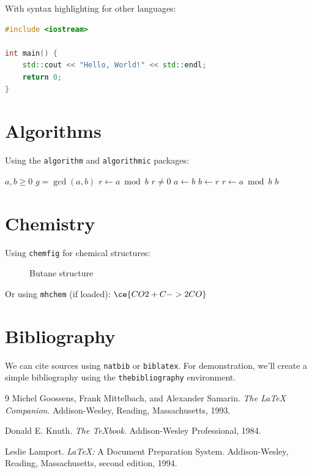 \documentclass{article}
\begin{document}
With syntax highlighting for other languages:

\begin{lstlisting}[language=C++, caption={Hello World in C++}, label={lst:hello}]
#include <iostream>

int main() {
    std::cout << "Hello, World!" << std::endl;
    return 0;
}
\end{lstlisting}

\section{Algorithms}
Using the \texttt{algorithm} and \texttt{algorithmic} packages:

\begin{algorithm}
\caption{Euclidean algorithm for GCD}
\label{alg:euclid}
\begin{algorithmic}
\REQUIRE $a,b \geq 0$
\ENSURE $g = \gcd(a,b)$
\STATE $r \gets a \bmod b$
\WHILE $r \neq 0$
\STATE $a \gets b$
\STATE $b \gets r$
\STATE $r \gets a \bmod b$
\ENDWHILE
\RETURN $b$
\end{algorithmic}
\end{algorithm}

\section{Chemistry}
Using \texttt{chemfig} for chemical structures:

\begin{figure}[H]
    \centering
    \caption{Butane structure}
    \label{fig:butane}
\end{figure}

Or using \texttt{mhchem} (if loaded): $\ce{CO2 + C -> 2 CO}$

\section{Bibliography}
We can cite sources using \texttt{natbib} or \texttt{biblatex}. For demonstration, we'll create a simple bibliography using the \texttt{thebibliography} environment.

\begin{thebibliography}{9}
Michel Goossens, Frank Mittelbach, and Alexander Samarin.
\textit{The \LaTeX{} Companion}.
Addison-Wesley, Reading, Massachusetts, 1993.

Donald E. Knuth.
\textit{The \TeX{}book}.
Addison-Wesley Professional, 1984.

Leslie Lamport.
\textit{\LaTeX:} A Document Preparation System.
Addison-Wesley, Reading, Massachusetts, second edition, 1994.
\end{thebibliography}
\end{document}
